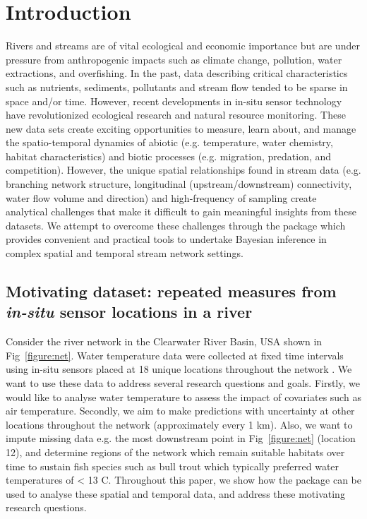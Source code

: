 \section{Introduction}

Rivers and streams are of vital ecological and economic importance \citep{vorosmarty2010global} but are under pressure from anthropogenic impacts such as climate change, pollution, water extractions, and overfishing. In the past, data describing critical characteristics such as nutrients, sediments, pollutants and stream flow tended to be sparse in space and/or time. However, recent developments in in-situ sensor technology have revolutionized ecological research and natural resource monitoring. These new data sets create exciting opportunities to measure, learn about, and manage the spatio-temporal dynamics of abiotic (e.g. temperature, water chemistry, habitat characteristics) and biotic processes (e.g. migration, predation, and competition). However, the unique spatial relationships found in stream data (e.g. branching network structure, longitudinal (upstream/downstream) connectivity, water flow volume and direction) and high-frequency of sampling create analytical challenges that make it difficult to gain meaningful insights from these datasets. We attempt to overcome these challenges through the  package which provides convenient and practical tools to undertake Bayesian inference in complex spatial and temporal stream network settings.  



\subsection{Motivating dataset: repeated measures from \emph{in-situ} sensor locations in a river}
\label{sec:motiv}

Consider the river network in the Clearwater River Basin, USA shown in Fig~\ref{figure:net}. 
Water temperature data were collected at fixed time intervals using in-situ sensors placed at 18 unique locations throughout the network \citep{isaak2018principal}. 
We want to use these data to address several research questions and goals.
Firstly, we would like to analyse water temperature to assess the impact of covariates such as air temperature. 
Secondly, we aim to make predictions with uncertainty at other locations throughout the network (approximately every 1 km). 
Also, we want to impute missing data e.g. the most downstream point in Fig~\ref{figure:net} (location 12), and determine regions of the network which remain suitable habitats over time to sustain fish species such as bull trout which typically preferred water temperatures of < 13 \textdegree{}C.  
Throughout this paper, we show how the  package can be used to analyse these spatial and temporal data, and address these motivating research questions.


